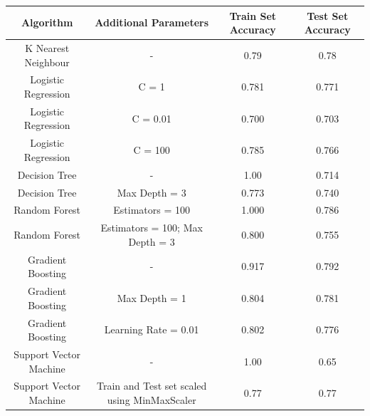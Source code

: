 \documentclass[12pt]{article}
\begin{document}
{%

    \clearpage%
    \thispagestyle{empty}%
    \begin{landscape}%
    \centering %
\begin{table}[]
\begin{tabular}{|c|c|c|c|}
\hline
Algorithm              & Additional Parameters                              & Train Set Accuracy & Test Set Accuracy \\ \hline
K Nearest Neighbour    & -                                                  & 0.79               & 0.78              \\ \hline
Logistic Regression    & C = 1                                              & 0.781              & 0.771             \\ \hline
Logistic Regression    & C = 0.01                                           & 0.700              & 0.703             \\ \hline
Logistic Regression    & C = 100                                            & 0.785              & 0.766             \\ \hline
Decision Tree          & -                                                  & 1.00               & 0.714             \\ \hline
Decision Tree          & Max Depth = 3                                      & 0.773              & 0.740             \\ \hline
Random Forest          & Estimators = 100                                   & 1.000              & 0.786             \\ \hline
Random Forest          & Estimators = 100; Max Depth = 3                    & 0.800              & 0.755             \\ \hline
Gradient Boosting      & -                                                  & 0.917              & 0.792             \\ \hline
Gradient Boosting      & Max Depth = 1                                      & 0.804              & 0.781             \\ \hline
Gradient Boosting      & Learning Rate = 0.01                               & 0.802              & 0.776             \\ \hline
Support Vector Machine & -                                                  & 1.00               & 0.65              \\ \hline
Support Vector Machine & Train and Test set scaled using MinMaxScaler       & 0.77               & 0.77              \\ \hline

\end{tabular}
\end{table}
\end{landscape}}
\end{document}
